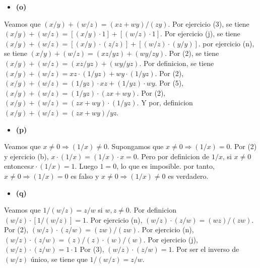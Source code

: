 \documentclass{article}
\begin{document}
\begin{itemize}
\item \bf (o) \rm 
\end{itemize}
Veamos que \(\left(x/y\right)+\left(w/z\right)=\left(xz+wy\right)/\left(zy\right)\). Por ejercicio (3), se tiene \(\left(x/y\right)+\left(w/z\right)=\left[\left(x/y\right)\cdot 1\right]+\left[\left(w/z\right)\cdot 1\right]\). Por ejercicio (j), se tiene \(\left(x/y\right)+\left(w/z\right)=\left[\left(x/y\right)\cdot \left( z/z\right)\right]+\left[\left(w/z\right)\cdot \left(y/y\right)\right]\). por ejercicio (n), se tiene \(\left(x/y\right)+\left(w/z\right)=\left(xz/yz\right)+\left(wy/zy\right)\). Por (2), se tiene \(\left(x/y\right)+\left(w/z\right)=\left(xz/yz\right)+\left(wy/yz\right)\). Por definicion, se tiene \(\left(x/y\right)+\left(w/z\right)=xz\cdot\left(1/yz\right)+wy\cdot\left(1/yz\right)\). Por (2), \(\left(x/y\right)+\left(w/z\right)=\left(1/yz\right)\cdot xz+\left(1/yz\right)\cdot wy\). Por (5), \(\left(x/y\right)+\left(w/z\right)=\left(1/yz\right)\cdot \left(zx+wy\right)\). Por (2), \(\left(x/y\right)+\left(w/z\right)=\left(zx+wy\right)\cdot\left(1/yz\right)\). Y por, definicion \(\left(x/y\right)+\left(w/z\right)=\left(zx+wy\right)/yz\).
\begin{itemize}
\item \bf (p) \rm 
\end{itemize}
Veamos que \(x\neq0\Longrightarrow\left(1/x \right)\neq0\). Supongamos que \(x\neq0\Longrightarrow\left(1/x \right)=0\). Por (2) y ejercicio (b), \(x\cdot\left(1/x \right)=\left(1/x\right)\cdot x=0\). Pero por definicion de \(1/x\), si \(x\neq0\) entonces\(x\cdot\left(1/x\right)=1\). Luego \(1=0\), lo que es imposible. por tanto, \(x\neq0\Longrightarrow\left(1/x \right)=0\) es falso y \(x\neq0\Longrightarrow\left(1/x \right)\neq0\) es verdadero.
\begin{itemize}
\item \bf (q) \rm 
\end{itemize}
Veamos que \(1/\left(w/z\right)=z/w\) si \(w,z\neq0\). Por definicion \(\left(w/z\right)\cdot\left[1/\left(w/z\right)\right]=1\). Por ejercicio (n), \(\left(w/z\right)\cdot\left(z/w\right)=\left(wz\right)/\left(zw\right)\). Por (2), \(\left(w/z\right)\cdot\left(z/w\right)=\left(zw\right)/\left(zw\right)\). Por ejercicio (n), \(\left(w/z\right)\cdot\left(z/w\right)=\left(z\right)/\left(z\right)\cdot\left(w\right)/\left(w\right)\). Por ejercicio (j),  \(\left(w/z\right)\cdot\left(z/w\right)=1\cdot1\) Por (3), \(\left(w/z\right)\cdot\left(z/w\right)=1\). Por ser el inverso de \(\left(w/z\right)\) único, se tiene que \(1/\left(w/z\right)=z/w\).
\end{document}
